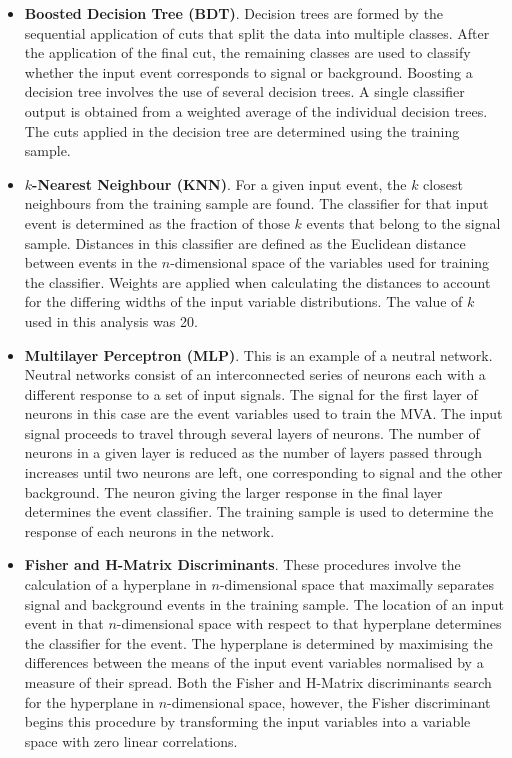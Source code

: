 \begin{itemize}
\item \textbf{Boosted Decision Tree (BDT)}.  Decision trees are formed by the sequential application of cuts that split the data into multiple classes.  After the application of the final cut, the remaining classes are used to classify whether the input event corresponds to signal or background.  Boosting a decision tree involves the use of several decision trees.  A single classifier output is obtained from a weighted average of the individual decision trees.  The cuts applied in the decision tree are determined using the training sample.  
\item \textbf{$k$-Nearest Neighbour (KNN)}.  For a given input event, the $k$ closest neighbours from the training sample are found.  The classifier for that input event is determined as the fraction of those $k$ events that belong to the signal sample.  Distances in this classifier are defined as the Euclidean distance between events in the $n$-dimensional space of the variables used for training the classifier.  Weights are applied when calculating the distances to account for the differing widths of the input variable distributions.  The value of $k$ used in this analysis was 20.
\item \textbf{Multilayer Perceptron (MLP)}.  This is an example of a neutral network.  Neutral networks consist of an interconnected series of neurons each with a different response to a set of input signals.  The signal for the first layer of neurons in this case are the event variables used to train the MVA.  The input signal proceeds to travel through several layers of neurons.  The number of neurons in a given layer is reduced as the number of layers passed through increases until two neurons are left, one corresponding to signal and the other background.  The neuron giving the larger response in the final layer determines the event classifier.  The training sample is used to determine the response of each neurons in the network.
\item \textbf{Fisher and H-Matrix Discriminants}.  These procedures involve the calculation of a hyperplane in $n$-dimensional space that maximally separates signal and background events in the training sample.  The location of an input event in that $n$-dimensional space with respect to that hyperplane determines the classifier for the event.  The hyperplane is determined by maximising the differences between the means of the input event variables normalised by a measure of their spread.  Both the Fisher and H-Matrix discriminants search for the hyperplane in $n$-dimensional space, however, the Fisher discriminant begins this procedure by transforming the input variables into a variable space with zero linear correlations.  

\end{itemize}
